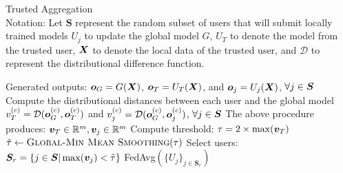 \documentclass{article} %
\begin{document}
\begin{algorithm}[H]
\caption{Trusted Aggregation \\ 
Notation: Let ${\bm S}$ represent the random subset of users that will submit locally trained models $U_j$ to update the global model $G$, $U_T$ to denote the model from the trusted user, ${\bm{X}}$ to denote the local data of the trusted user, and $\mathcal{D}$ to represent the distributional difference function.
}
\label{alg:t-agg}
\begin{algorithmic}[1]

        \State Generated outputs: ${\bm{o}}_G = G({\bm{X}})$, ${\bm{o}}_{T} = U_T({\bm{X}})$, and ${\bm{o}}_j = U_j({\bm{X}})$, $\forall j \in {\bm{S}}$
            \State Compute the distributional distances between each user and the global model
            \State \quad $v^{(c)}_T = \mathcal{D}({\bm{o}}^{(c)}_G, {\bm{o}}^{(c)}_T)$ and $v^{(c)}_{j} = \mathcal{D}({\bm{o}}^{(c)}_G, {\bm{o}}^{(c)}_{j})$, $\forall j \in {\bm{S}}$
        \EndFor
        \State The above procedure produces: ${\bm{v}}_T\in{\mathbb{R}}^m, {\bm{v}}_j\in{\mathbb{R}}^m$
        \State Compute threshold: $\tau = 2 \times\max ( {\bm{v}}_T )$
        \State  $\tilde{\tau} \gets \Call{Global-Min Mean Smoothing}{\tau}$  
        \State Select users: ${\bm{S}}_r = \{j \in {\bm{S}} | \max({\bm{v}}_{j}) < \tilde{\tau} \}$
        \State \Return FedAvg$(\{U_j\}_{j \in {\bm S}_r})$ 
    \EndProcedure
\end{algorithmic}
\end{algorithm}
\end{document}
